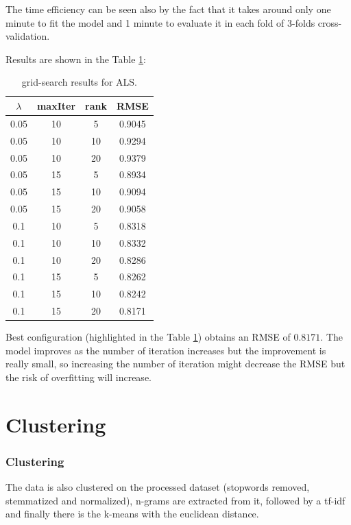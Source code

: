 \documentclass[fleqn,10pt]{SelfArx}
\begin{document}
The time efficiency can be seen also by the fact that it takes around only one minute to fit the model and 1 minute to evaluate it in each fold of 3-folds cross-validation.

Results are shown in the Table \ref{tab:als_grid}:
\begin{table}[!h]
    \centering
     \begin{tabular}{|c|c|c|c|}
          \hline
          $\lambda$ & maxIter & rank & RMSE\\
          \hline
          0.05 & 10 & 5  & 0.9045\\
          0.05 & 10 & 10 & 0.9294\\
          0.05 & 10 & 20 & 0.9379\\
          0.05 & 15 & 5  & 0.8934\\
          0.05 & 15 & 10 & 0.9094\\
          0.05 & 15 & 20 & 0.9058\\
          0.1  & 10 & 5  & 0.8318\\
          0.1  & 10 & 10 & 0.8332\\
          0.1  & 10 & 20 & 0.8286\\
          0.1  & 15 & 5  & 0.8262\\
          0.1  & 15 & 10 & 0.8242\\
          \rowcolor{orange} 
          0.1  & 15 & 20 & 0.8171\\
          \hline
     \end{tabular}
    \caption{grid-search results for ALS.}
    \label{tab:als_grid}
\end{table}

Best configuration (highlighted in the Table \ref{tab:als_grid}) obtains an RMSE of $0.8171$. 
The model improves as the number of iteration increases but the improvement is really small, so increasing the number of iteration might decrease the RMSE but the risk of overfitting will increase.

\newpage
\part{Clustering}

\section{Clustering}
The data is also clustered on the processed dataset (stopwords removed, stemmatized and normalized), n-grams are extracted from it, followed by a tf-idf and finally there is the k-means with the euclidean distance.
\end{document}
